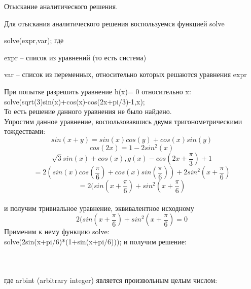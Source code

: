 ﻿ \documentclass[russian,utf8,nocolumnxxxi,nocolumnxxxii]{eskdtext}
\begin{document}
Отыскание аналитического решения.

Для отыскания аналитического решения воспользуемся функцией solve 

solve(expr,var); где

expr – список из уравнений (то есть система)

var – список из переменных, относительно которых решаются уравнения expr

При попытке разрешить уравнение h(x)= 0 относительно x:\\
solve(sqrt(3)sin(x)+cos(x)-cos(2x+pi/3)-1,x);\\

То есть решение данного уравнения не было найдено.\\
Упростим данное уравнение, воспользовавшись двумя тригонометрическими тождествами: $$sin(x+y)=sin(x)cos(y)+cos(x)sin(y)$$
$$cos(2x)=1-2sin^2(x) $$
$$\sqrt{3}sin(x)+cos(x),g(x)-cos(2x+\frac{\pi}{3})+1$$ $$=2(sin(x)cos(\frac{\pi}{6})+cos(x)sin(\frac{\pi}{6}))+2sin^2(x+\frac{\pi}{6})$$ $$=2(sin(x+\frac{\pi}{6})+sin^2(x+\frac{\pi}{6})$$\\
и получим тривиальное уравнение, эквивалентное исходному
$$2(sin(x+\frac{\pi}{6})+sin^2(x+\frac{\pi}{6})=0$$
Применим к нему функцию solve:\\
solve(2sin(x+pi/6)*(1+sin(x+pi/6)));
и получим решение:
\newpage

\begin{figure}[H]
\begin{center}
\begin{minipage}[h]{0.65\linewidth}
  \\
\frametitle{}
\end{minipage}
\end{center}
\end{figure}


где arbint (arbitrary integer) является произвольным целым числом:
\end{document}
